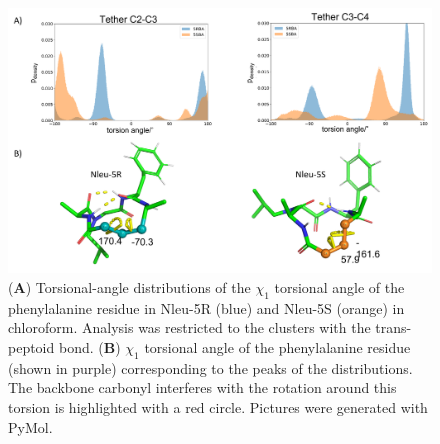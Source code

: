 \begin{figure}[h!]
    \centering
    \includegraphics[width=\textwidth]{7_chapter_5/fig/results/dihedral_dist.png}
    \caption{(\textbf{A}) Torsional-angle distributions of the $\chi_1$ torsional angle of the phenylalanine residue in Nleu-5R (blue) and Nleu-5S (orange) in chloroform. Analysis was restricted to the clusters with the trans-peptoid bond. (\textbf{B}) $\chi_1$ torsional angle of the phenylalanine residue (shown in purple) corresponding to the peaks of the distributions. The backbone carbonyl interferes with the rotation around this torsion is highlighted with a red circle. Pictures were generated with PyMol. \cite{Delano2020}}
    \label{fig: dihedralDistSubst}
\end{figure}

